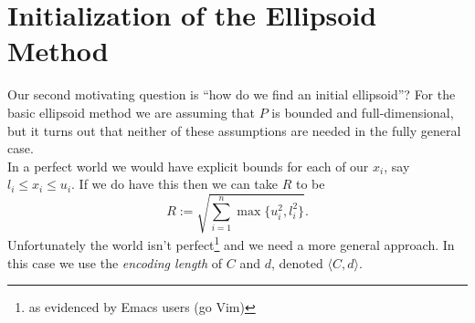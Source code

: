 \section{Initialization of the Ellipsoid Method}
Our second motivating question is ``how do we find an initial ellipsoid''? For
the basic ellipsoid method we are assuming that \(P\) is bounded and
full-dimensional, but it turns out that neither of these assumptions are needed
in the fully general case.\\

In a perfect world we would have explicit bounds for each of our \(x_i\), say
\(l_i \leq x_i \leq u_i\). If we do have this then we can take \(R\) to be
%
\[R := \sqrt{\sum_{i=1}^n \max\{u_i^2, l_i^2\}}.\]
%
Unfortunately the world isn't perfect\footnote{as evidenced by Emacs users (go
Vim)} and we need a more general approach. In this case we use the
\textit{encoding length} of \(C\) and \(d\), denoted \(\langle C, d\rangle\).

